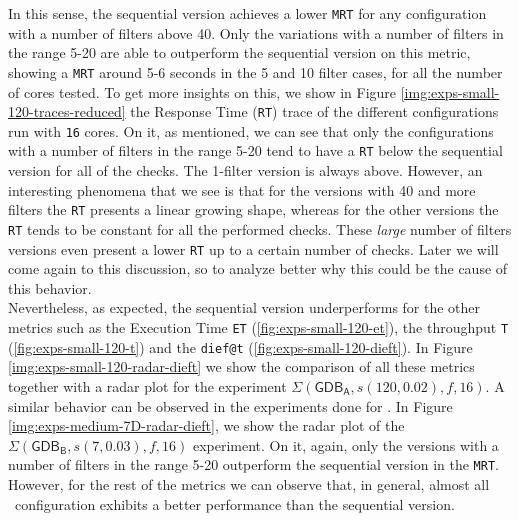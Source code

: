 In this sense, the sequential version achieves a lower \texttt{MRT} for any configuration with a number of filters above 40. Only the variations with a number of filters in the range 5-20 are able to outperform the sequential version on this metric, showing a \texttt{MRT} around 5-6 seconds in the 5 and 10 filter cases, for all the number of cores tested. To get more insights on this, we show in Figure \ref{img:exps-small-120-traces-reduced} the Response Time (\texttt{RT}) trace of the different configurations run with \texttt{16} cores. On it, as mentioned, we can see that only the configurations with a number of filters in the range 5-20 tend to have a \texttt{RT} below the sequential version for all of the checks. The 1-filter version is always above. However, an interesting phenomena that we see is that for the versions with 40 and more filters the \texttt{RT} presents a linear growing shape, whereas for the other versions the \texttt{RT} tends to be constant for all the performed checks. These \textit{large} number of filters versions even present a lower \texttt{RT} up to a certain number of checks. Later we will come again to this discussion, so to analyze better why this could be the cause of this behavior.
\\ 

Nevertheless, as expected, the sequential version underperforms for the other metrics such as the
Execution Time \texttt{ET} (\ref{fig:exps-small-120-et}), the throughput \texttt{T} (\ref{fig:exps-small-120-t}) and the \texttt{dief@t} (\ref{fig:exps-small-120-dieft}). In Figure \ref{img:exps-small-120-radar-dieft} we show the comparison of all these metrics together with a radar plot for the experiment $\Sigma(\mathsf{GDB_A}, s(120, 0.02), f, 16)$. A similar behavior can be observed in the experiments done for \mediumG. In Figure \ref{img:exps-medium-7D-radar-dieft}, we show the radar plot of the $\Sigma(\mathsf{GDB_B}, s(7, 0.03), f, 16)$ experiment. On it, again, only the versions with a number of filters in the range 5-20 outperform the sequential version in the \texttt{MRT}. However, for the rest of the metrics we can observe that, in general, almost all \DPATM\ configuration exhibits a better performance than the sequential version. \\


